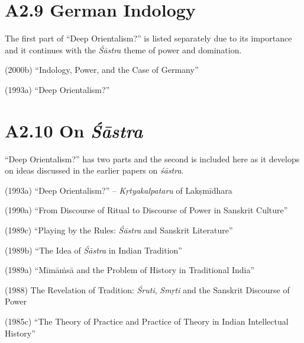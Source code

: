 \vspace{-.4cm}

\section*{A2.9 German Indology}

The first part of “Deep Orientalism?” is listed separately due to its importance and it continues with the \textit{Śāstra} theme of power and domination.

(2000b) “Indology, Power, and the Case of Germany”

(1993a) “Deep Orientalism?”

\newpage

\vspace{-.3cm}

\section*{A2.10 On {\it {\bfseries Śāstra}}}

“Deep Orientalism?” has two parts and the second is included here as it develops on ideas discussed in the earlier papers on \textit{śāstra}.

(1993a) “Deep Orientalism?” – \textit{Kṛtyakalpataru} of Lakṣmīdhara

(1990a) “From Discourse of Ritual to Discourse of Power in Sanskrit Culture”

(1989c) “Playing by the Rules: \textit{Śāstra} and Sanskrit Literature”

(1989b) “The Idea of \textit{Śāstra} in Indian Tradition”

(1989a) “Mīmāṁsā and the Problem of History in Traditional India”

(1988) The Revelation of Tradition: \textit{Śruti}, \textit{Smṛti} and the Sanskrit Discourse of Power 


(1985c) “The Theory of Practice and Practice of Theory in Indian Intellectual History”

\vspace{-.5cm}

